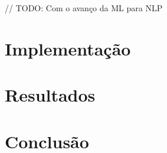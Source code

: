 \documentclass[conference]{IEEEtran}
\begin{document}
// TODO: Com o avanço da ML para NLP

\section{Implementação}

\section{Resultados} 

\section{Conclusão}





\renewcommand{\refname}{Referências}

\end{document}
